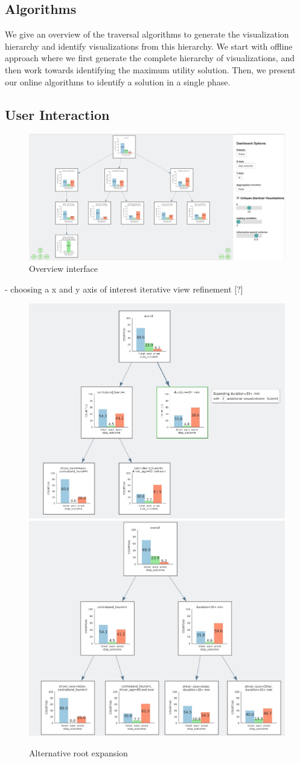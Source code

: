 \subsection{Algorithms}
We give an overview of the traversal algorithms to generate the visualization hierarchy and identify visualizations from this hierarchy. We start with offline approach where we first generate the complete hierarchy of visualizations, and then work towards identifying the maximum utility solution. Then, we present our online algorithms to identify a solution in a single phase. 


\subsection{User Interaction}
\begin{figure}[ht!]
\label{overview}
\centering
\includegraphics[width=\linewidth]{figures/overview2.jpeg}
\caption{Overview interface}
\end{figure}

- choosing a x and y axis of interest 
iterative view refinement [?]
\begin{figure}[ht!]
\label{overview}
\centering
\includegraphics[width=0.44\linewidth]{figures/before_expansion.jpeg}
\includegraphics[width=0.44\linewidth]{figures/after_expansion.jpeg}
\caption{Alternative root expansion}
\end{figure}
